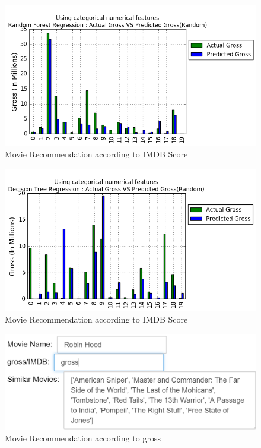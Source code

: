 \documentclass{article}%
\begin{document}
\begin{figure}
\centering
\includegraphics[width=1.0\columnwidth]{Fig/RFR.png}
\caption{Movie Recommendation according to IMDB Score}
\label{fig:RFR}
\end{figure}

\begin{figure}
\centering
\includegraphics[width=1.0\columnwidth]{Fig/DTR.png}
\caption{Movie Recommendation according to IMDB Score}
\label{fig:DTR}
\end{figure}

\begin{figure}
\centering
\includegraphics[width=1.0\columnwidth]{Fig/suggestiongross.PNG}
\caption{Movie Recommendation according to gross}
\label{fig:suggestiongross}
\end{figure}
\end{document}
